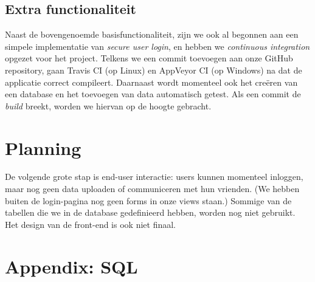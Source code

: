 \documentclass[12pt,a4paper,parskip=full]{article}
\begin{document}
\subsection{Extra functionaliteit}

Naast de bovengenoemde basisfunctionaliteit, zijn we ook al begonnen aan een 
simpele implementatie van \emph{secure user login}, en hebben we 
\emph{continuous integration} opgezet voor het project. Telkens we een {commit} 
toevoegen aan onze GitHub {repository}, gaan Travis CI (op Linux) en AppVeyor 
CI (op Windows) na dat de applicatie correct compileert. Daarnaast wordt 
momenteel ook het cre\"eren van een database en het toevoegen van data 
automatisch getest. Als een commit de \textit{build} breekt, worden we hiervan 
op de hoogte gebracht.

\section{Planning}
De volgende grote stap is end-user interactie: users kunnen momenteel inloggen, 
maar nog geen data uploaden of communiceren met hun vrienden.
(We hebben buiten de login-pagina nog geen forms in onze views staan.)
Sommige van de tabellen die we in de database gedefinieerd hebben, worden nog 
niet gebruikt. Het design van de front-end is ook niet finaal.

\pagebreak
\section{Appendix: SQL}
\lstset{language=SQL,basicstyle=\ttfamily}

\end{document}

